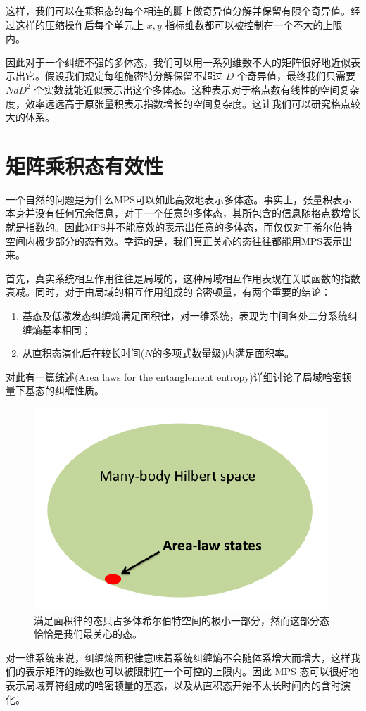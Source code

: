 \documentclass[UTF8]{ctexart}
\begin{document}
这样，我们可以在乘积态的每个相连的脚上做奇异值分解并保留有限个奇异值。经过这样的压缩操作后每个单元上 $x,y$ 指标维数都可以被控制在一个不大的上限内。

因此对于一个纠缠不强的多体态，我们可以用一系列维数不大的矩阵很好地近似表示出它。假设我们规定每组施密特分解保留不超过 $D$ 个奇异值，最终我们只需要 $NdD^{2}$ 个实数就能近似表示出这个多体态。这种表示对于格点数有线性的空间复杂度，效率远远高于原张量积表示指数增长的空间复杂度。这让我们可以研究格点较大的体系。

\section*{矩阵乘积态有效性}
\noindent 一个自然的问题是为什么MPS可以如此高效地表示多体态。事实上，张量积表示本身并没有任何冗余信息，对于一个任意的多体态，其所包含的信息随格点数增长就是指数的。因此MPS并不能高效的表示出任意的多体态，而仅仅对于希尔伯特空间内极少部分的态有效。幸运的是，我们真正关心的态往往都能用MPS表示出来。

首先，真实系统相互作用往往是局域的，这种局域相互作用表现在关联函数的指数衰减。同时，对于由局域的相互作用组成的哈密顿量，有两个重要的结论：
\begin{enumerate}
	\item 基态及低激发态纠缠熵满足面积律，对一维系统，表现为中间各处二分系统纠缠熵基本相同；
	\item 从直积态演化后在较长时间($N$的多项式数量级)内满足面积率。
\end{enumerate}
对此有一篇综述(\href{https://arxiv.org/abs/0808.3773}{Area laws for the entanglement entropy})详细讨论了局域哈密顿量下基态的纠缠性质。
\begin{figure}[H]
\begin{centering}
\includegraphics[width=0.5\linewidth]{include/p6}
\caption{满足面积律的态只占多体希尔伯特空间的极小一部分，然而这部分态恰恰是我们最关心的态。}
\par\end{centering}
\end{figure}
\noindent 对一维系统来说，纠缠熵面积律意味着系统纠缠熵不会随体系增大而增大，这样我们的表示矩阵的维数也可以被限制在一个可控的上限内。因此 MPS 态可以很好地表示局域算符组成的哈密顿量的基态，以及从直积态开始不太长时间内的含时演化。
\end{document}
